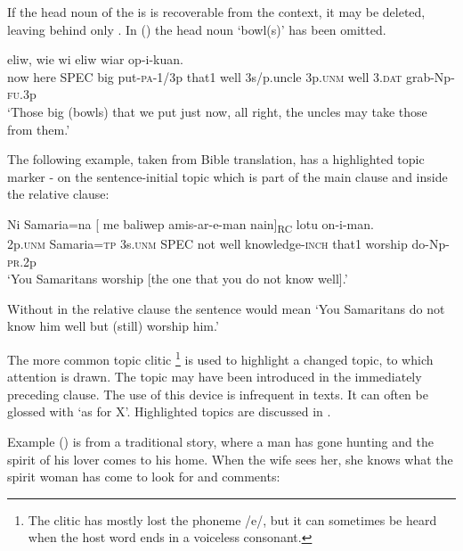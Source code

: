 If the head noun of the  is is recoverable from the context, it may be deleted, leaving behind only . In () the head noun  `bowl(s)' has been omitted.

\ea%
\label{ex:x1682}
 eliw, wie wi eliw wiar op-i-kuan.\\
now here SPEC big put-\textsc{pa}-1/3p that1 well 3s/p.uncle 3p.\textsc{unm} well 3.\textsc{dat} grab-Np-\textsc{fu}.3p\\
\glt`Those big (bowls) that we put just now, all right, the uncles may take those from them.'
\z

The following example, taken from Bible translation, has a highlighted topic marker - on the sentence-initial topic  which is part of the main clause\textstyleAcronymallcaps{,} and  inside the relative clause:

\ea%
\label{ex:x1816}
\gll Ni Samaria=na [  me baliwep amis-ar-e-man nain]\textsubscript{RC} lotu on-i-man.\\
2p.\textsc{unm} Samaria=\textsc{tp} 3s.\textsc{unm} SPEC not well knowledge-\textsc{inch} that1 worship do-Np-\textsc{pr}.2p\\
\glt`You Samaritans worship [the one that you do not know well].'
\z

Without  in the relative clause the sentence would mean `You Samaritans do not know him well but (still) worship him.'

The more common topic clitic \footnote{The clitic has mostly lost the phoneme /e/, but it can sometimes be heard when the host word ends in a voiceless consonant. } is used to highlight a changed topic, to which attention is drawn. The topic may have been introduced in the immediately preceding clause. The use of this device is infrequent in texts. It can often be glossed with `as for X'. Highlighted topics are discussed in .

Example () is from a traditional story, where a man has gone hunting and the spirit of his lover comes to his home. When the wife sees her, she knows what the spirit woman has come to look for and comments:

